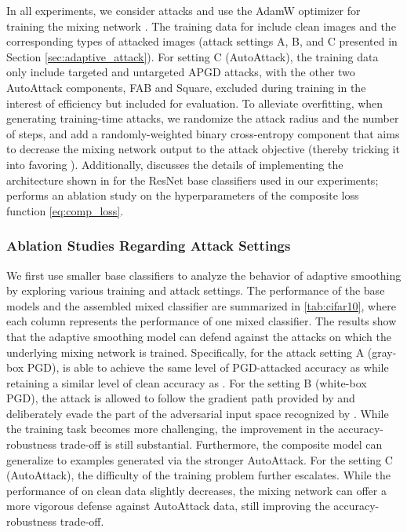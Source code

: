 \documentclass[11pt, letterpaper]{article}
\theoremstyle{plain}
\theoremstyle{definition}
\begin{document}
In all experiments, we consider  attacks and use the AdamW optimizer \citep{Kingma15} for training the mixing network . The training data for  include clean images and the corresponding types of attacked images (attack settings A, B, and C presented in Section \ref{sec:adaptive_attack}). For setting C (AutoAttack), the training data only include targeted and untargeted APGD attacks, with the other two AutoAttack components, FAB and Square, excluded during training in the interest of efficiency but included for evaluation. To alleviate overfitting, when generating training-time attacks, we randomize the attack radius and the number of steps, and add a randomly-weighted binary cross-entropy component that aims to decrease the mixing network output to the attack objective (thereby tricking it into favoring ). Additionally,  discusses the details of implementing the architecture shown in  for the ResNet base classifiers used in our experiments;  performs an ablation study on the hyperparameters of the composite loss function \cref{eq:comp_loss}.


\subsubsection{Ablation Studies Regarding Attack Settings} \label{sec:adap_exp_abla}

We first use smaller base classifiers to analyze the behavior of adaptive smoothing by exploring various training and attack settings. The performance of the base models and the assembled mixed classifier are summarized in \cref{tab:cifar10}, where each column represents the performance of one mixed classifier. The results show that the adaptive smoothing model can defend against the attacks on which the underlying mixing network is trained.
Specifically, for the attack setting A (gray-box PGD),  is able to achieve the same level of PGD-attacked accuracy as  while retaining a similar level of clean accuracy as .
For the setting B (white-box PGD), the attack is allowed to follow the gradient path provided by  and deliberately evade the part of the adversarial input space recognized by . While the training task becomes more challenging, the improvement in the accuracy-robustness trade-off is still substantial. Furthermore, the composite model can generalize to examples generated via the stronger AutoAttack.
For the setting C (AutoAttack), the difficulty of the training problem further escalates. While the performance of  on clean data slightly decreases, the mixing network can offer a more vigorous defense against AutoAttack data, still improving the accuracy-robustness trade-off.
\end{document}

